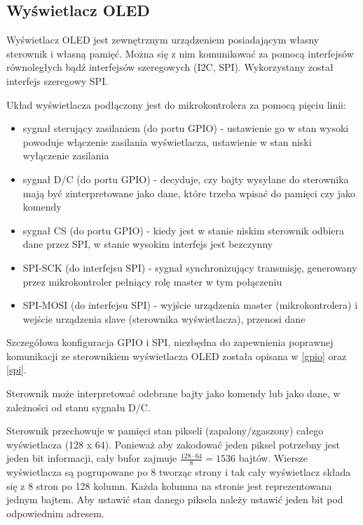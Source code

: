 \subsection{Wyświetlacz OLED} \label{oled}

Wyświetlacz OLED jest zewnętrznym urządzeniem posiadającym własny sterownik i własną pamięć. Można się z nim komunikować za pomocą interfejsów równoległych bądź interfejsów szeregowych (I2C, SPI). Wykorzystany został interfejs szeregowy SPI.

Układ wyświetlacza podłączony jest do mikrokontrolera za pomocą pięciu linii:
\begin{itemize}
    \item sygnał sterujący zasilaniem (do portu GPIO) - ustawienie go w stan wysoki powoduje włączenie zasilania wyświetlacza, ustawienie w stan niski wyłączenie zasilania
    \item sygnał D/C (do portu GPIO) - decyduje, czy bajty wysyłane do sterownika mają być zinterpretowane jako dane, które trzeba wpisać do pamięci czy jako komendy
    \item sygnał CS (do portu GPIO) - kiedy jest w stanie niskim sterownik odbiera dane przez SPI, w stanie wysokim interfejs jest bezczynny
    \item SPI-SCK (do interfejsu SPI) - sygnał synchronizujący transmisję, generowany przez mikrokontroler pełniący rolę master w tym połączeniu
    \item SPI-MOSI (do interfejsu SPI) - wyjście urządzenia master (mikrokontrolera) i wejście urządzenia slave (sterownika wyświetlacza), przenosi dane
\end{itemize}

Szczegółowa konfiguracja GPIO i SPI, niezbędna do zapewnienia poprawnej komunikacji ze sterownikiem wyświetlacza OLED została opisana w \ref{gpio} oraz \ref{spi}.

Sterownik może interpretować odebrane bajty jako komendy lub jako dane, w zależności od stanu sygnału D/C.

Sterownik przechowuje w pamięci stan pikseli (zapalony/zgaszony) całego wyświetlacza (128 x 64). Ponieważ aby zakodować jeden piksel potrzebny jest jeden bit informacji, cały bufor zajmuje $\frac{128 \cdot 64}{8}=1536$ bajtów. Wiersze wyświetlacza są pogrupowane po 8 tworząc strony i tak cały wyświetlacz składa się z 8 stron po 128 kolumn. Każda kolumna na stronie jest reprezentowana jednym bajtem. Aby ustawić stan danego piksela należy ustawić jeden bit pod odpowiednim adresem.

